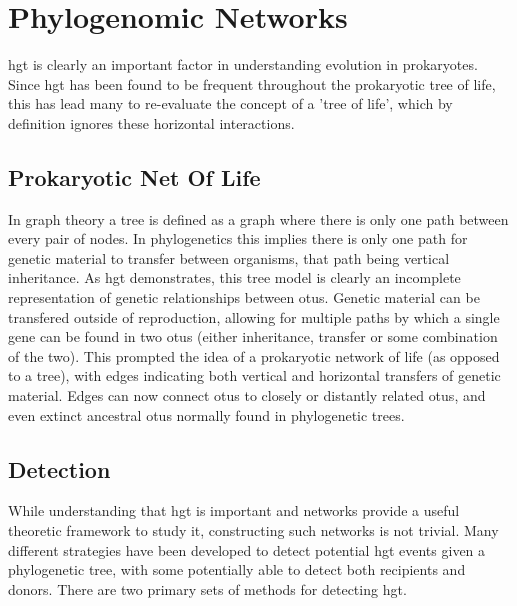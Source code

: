\documentclass[12pt,letter]{article}
\begin{document}
\section{Phylogenomic Networks}
\ac{hgt} is clearly an important factor in understanding evolution in prokaryotes.
Since \ac{hgt} has been found to be frequent throughout the prokaryotic tree of life, this has lead many to re-evaluate the concept of a 'tree of life', which by definition ignores these horizontal interactions\citep{netoflife}.
\subsection{Prokaryotic Net Of Life}
In graph theory a tree is defined as a graph where there is only one path between every pair of nodes.
In phylogenetics this implies there is only one path for genetic material to transfer between organisms, that path being vertical inheritance.
As \ac{hgt} demonstrates, this tree model is clearly an incomplete representation of genetic relationships between \ac{otu}s.
Genetic material can be transfered outside of reproduction, allowing for multiple paths by which a single gene can be found in two \ac{otu}s (either inheritance, transfer or some combination of the two)\citep{lgt}.
This prompted the idea of a prokaryotic network of life (as opposed to a tree), with edges indicating both vertical and horizontal transfers of genetic material\citep{netoflife}.
Edges can now connect \ac{otu}s to closely or distantly related \ac{otu}s, and even extinct ancestral \ac{otu}s normally found in phylogenetic trees.
\subsection{Detection}%
While understanding that \ac{hgt} is important and networks provide a useful theoretic framework to study it, constructing such networks is not trivial.
Many different strategies have been developed to detect potential \ac{hgt} events given a phylogenetic tree, with some potentially able to detect both recipients and donors\citep{ihgt}.
There are two primary sets of methods for detecting \ac{hgt}.
\end{document}
